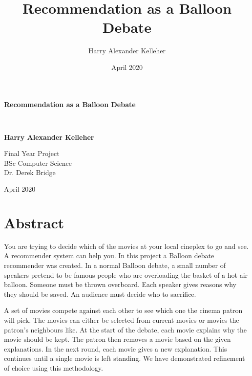 \documentclass[12pt]{report}
\title{Recommendation as a Balloon Debate}
\author{Harry Alexander Kelleher}
\date{April 2020}
\begin{document}

\begin{titlepage}
    \begin{center}
        
        \vspace*{1cm}
            
        \Huge
        \textbf{Recommendation as a Balloon Debate}
        
            
        \
        
            
        \vspace{2cm}
            
        \textbf{Harry Alexander Kelleher}
            
        \vfill
            
        Final Year Project\\
        BSc Computer Science\\
        Dr. Derek Bridge
            
        \vspace{0.8cm}
            
        
        \Large
        April 2020
    \end{center}
\end{titlepage}


\chapter*{Abstract}
    

    You are trying to decide which of the movies at your local cineplex to go and see. A recommender system can help you. In this project a Balloon debate recommender was created.  In a normal Balloon debate, a small number of speakers pretend to be famous people who are overloading the basket of a hot-air balloon. Someone must be thrown overboard. Each speaker gives reasons why they should be saved. An audience must decide who to sacrifice. 

    A set of movies compete against each other to see which one the cinema patron will pick. The movies can either be selected from current movies or movies the patron’s neighbours like. At the start of the debate, each movie explains why the movie should be kept. The patron then removes a movie based on the given explanations. In the next round, each movie gives a new explanation. This continues until a single movie is left standing. We have demonstrated refinement of choice using this methodology. 
\end{document}

